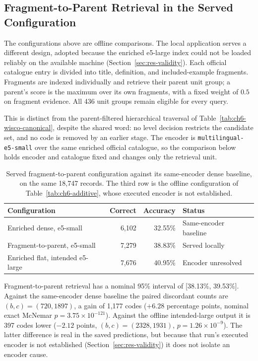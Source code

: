 \subsection{Fragment-to-Parent Retrieval in the Served Configuration}
\label{sec:res-parent-document}

The configurations above are offline comparisons. The local application
serves a different design, adopted because the enriched e5-large index
could not be loaded reliably on the available machine
(Section~\ref{sec:res-validity}). Each official catalogue entry is divided
into title, definition, and included-example fragments. Fragments are
indexed individually and retrieve their parent unit group; a parent's
score is the maximum over its own fragments, with a fixed weight of
$0.5$ on fragment evidence. All 436 unit groups remain eligible for every
query.

This is distinct from the parent-filtered hierarchical traversal of
Table~\ref{tab:ch6-wisco-canonical}, despite the shared word: no
level decision restricts the candidate set, and no code is removed by an
earlier stage. The encoder is \texttt{multilingual-e5-small} over the same
enriched official catalogue, so the comparison below holds encoder and
catalogue fixed and changes only the retrieval unit.

\begin{table}[htbp]
\centering
\caption{Served fragment-to-parent configuration against its same-encoder
dense baseline, on the same 18,747 records. The third row is the
offline configuration of Table~\ref{tab:ch6-additive}, whose executed
encoder is not established.}
\label{tab:ch6-parent-document}
\small\renewcommand{\arraystretch}{1.3}
\begin{tabular}{lrrl}
\toprule
\textbf{Configuration} & \textbf{Correct} & \textbf{Accuracy} & \textbf{Status} \\
\midrule
Enriched dense, e5-small & 6,102 & 32.55\% & Same-encoder baseline \\
Fragment-to-parent, e5-small & 7,279 & 38.83\% & Served locally \\
Enriched flat, intended e5-large & 7,676 & 40.95\% & Encoder unresolved \\
\bottomrule
\end{tabular}
\end{table}

Fragment-to-parent retrieval has a nominal 95\% interval of
[38.13\%, 39.53\%]. Against the same-encoder dense baseline the paired
discordant counts are $(b,c)=(720,1897)$, a gain of 1,177 codes
($+6.28$ percentage points, nominal exact McNemar
$p=3.75\times10^{-121}$). Against the offline intended-large output it is
397 codes lower ($-2.12$ points, $(b,c)=(2328,1931)$,
$p=1.26\times10^{-9}$). The latter difference is real in the saved
predictions, but because that run's executed encoder is not established
(Section~\ref{sec:res-validity}) it does not isolate an encoder cause.

